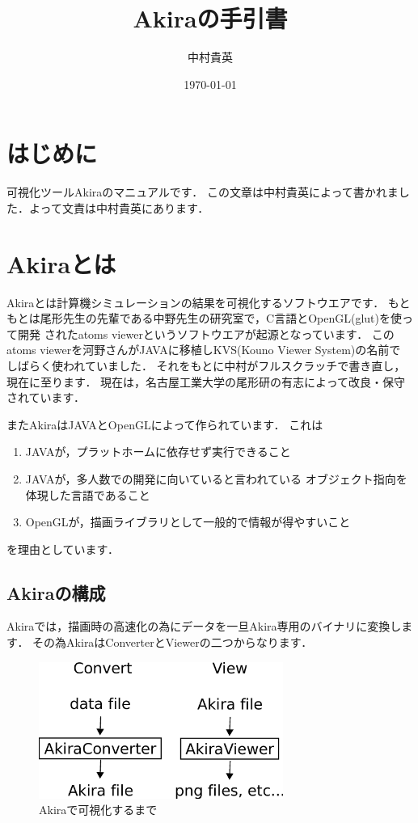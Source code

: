 \documentclass[a4j,openany]{jbook}
\title{{\Huge \textbf{Akiraの手引書}}\\ }
\author{中村貴英}
\date{\today}
\begin{document}
\maketitle
\frontmatter
\chapter{はじめに}
可視化ツールAkiraのマニュアルです．
この文章は中村貴英によって書かれました．よって文責は中村貴英にあります．

\tableofcontents
\mainmatter

\chapter{Akiraとは}
Akiraとは計算機シミュレーションの結果を可視化するソフトウエアです．
もともとは尾形先生の先輩である中野先生の研究室で，C言語とOpenGL(glut)を使って開発
されたatoms viewerというソフトウエアが起源となっています．
このatoms viewerを河野さんがJAVAに移植しKVS(Kouno Viewer System)の名前で
しばらく使われていました．
それをもとに中村がフルスクラッチで書き直し，現在に至ります．
現在は，名古屋工業大学の尾形研の有志によって改良・保守されています．

またAkiraはJAVAとOpenGLによって作られています．
これは
\begin{enumerate}
 \item JAVAが，プラットホームに依存せず実行できること
 \item JAVAが，多人数での開発に向いていると言われている
       オブジェクト指向を体現した言語であること
 \item OpenGLが，描画ライブラリとして一般的で情報が得やすいこと
\end{enumerate}
を理由としています．

 \section{Akiraの構成}
 Akiraでは，描画時の高速化の為にデータを一旦Akira専用のバイナリに変換します．
 その為AkiraはConverterとViewerの二つからなります．
 \begin{figure}[htbp]
  \begin{center}
   \includegraphics[width=8cm]{img/flow.eps}
  \end{center}
  \caption{Akiraで可視化するまで}
 \end{figure}
\end{document}
